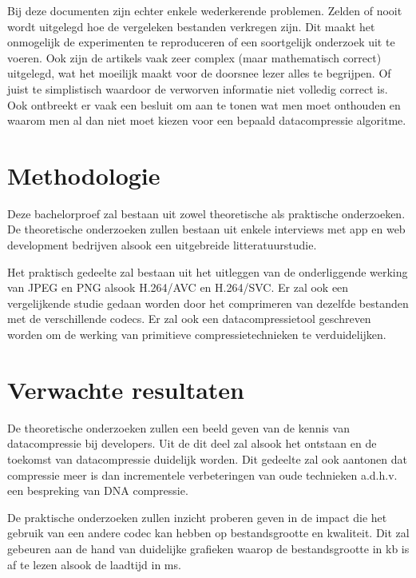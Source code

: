 Bij deze documenten zijn echter enkele wederkerende problemen. Zelden of nooit wordt uitgelegd hoe de vergeleken bestanden verkregen zijn. Dit maakt het onmogelijk de experimenten te reproduceren of een soortgelijk onderzoek uit te voeren. Ook zijn de artikels vaak zeer complex (maar mathematisch correct) uitgelegd, wat het moeilijk maakt voor de doorsnee lezer alles te begrijpen. Of juist te simplistisch waardoor de verworven informatie niet volledig correct is. Ook ontbreekt er vaak een besluit om aan te tonen wat men moet onthouden en waarom men al dan niet moet kiezen voor een bepaald datacompressie algoritme. 

\section{Methodologie}
\label{sec:methodologie}

Deze bachelorproef zal bestaan uit zowel theoretische als praktische onderzoeken. De theoretische onderzoeken zullen bestaan uit enkele interviews met app en web development bedrijven alsook een uitgebreide litteratuurstudie.

Het praktisch gedeelte zal bestaan uit het uitleggen van de onderliggende werking van JPEG en PNG alsook H.264/AVC en H.264/SVC. Er zal ook een vergelijkende studie gedaan worden door het comprimeren van dezelfde bestanden met de verschillende codecs. Er zal ook een datacompressietool geschreven worden om de werking van primitieve compressietechnieken te verduidelijken.

\section{Verwachte resultaten}
\label{sec:verwachte_resultaten}

De theoretische onderzoeken zullen een beeld geven van de kennis van datacompressie bij developers. Uit de dit deel zal alsook het ontstaan en de toekomst van datacompressie duidelijk worden. Dit gedeelte zal ook aantonen dat compressie meer is dan incrementele verbeteringen van oude technieken a.d.h.v. een bespreking van DNA compressie.

De praktische onderzoeken zullen inzicht proberen geven in de impact die het gebruik van een andere codec kan hebben op bestandsgrootte en kwaliteit. Dit zal gebeuren aan de hand van duidelijke grafieken waarop de bestandsgrootte in kb is af te lezen alsook de laadtijd in ms.

